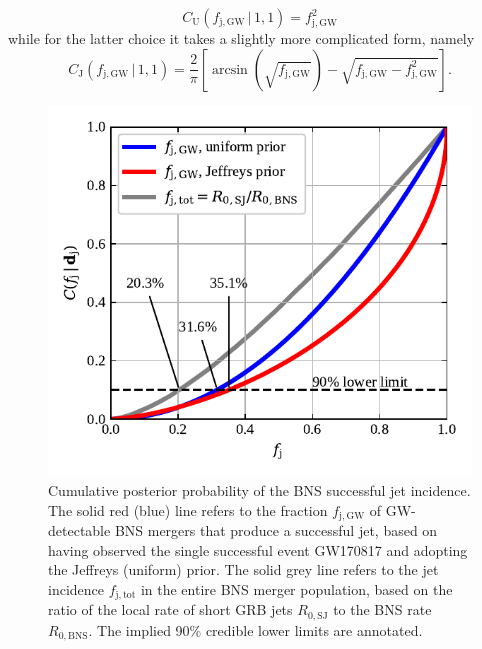 \documentclass[]{aa}
\newcommand{\resp}[1]{#1}
\begin{document}
\begin{equation}
 C_\mathrm{U}(f_\mathrm{j,GW}\,|\,1,1)=f_\mathrm{j,GW}^2
\end{equation}
while for the latter choice it takes a slightly more complicated form, namely 
\begin{equation}
C_\mathrm{J}(f_\mathrm{j,GW}\,|\,1,1)=\frac{2}{\pi}\left[\arcsin\left(\sqrt{f_\mathrm{j,GW}}\right)-\sqrt{f_\mathrm{j,GW}-f_\mathrm{j,GW}^2}\right].
\end{equation}
%
\begin{figure}
 \includegraphics[width=\columnwidth]{figures/cumulative_posterior.pdf}
 \caption{\small{Cumulative posterior probability of the BNS successful jet \resp{incidence}. The solid red (blue) line refers to the fraction $f_\mathrm{j,GW}$ of GW-detectable BNS mergers that produce a successful jet, based on having observed \resp{the} single successful event \resp{GW170817} and adopting the Jeffreys (uniform) prior. The solid grey line refers to the jet \resp{incidence} $f_\mathrm{j,tot}$ \resp{in the entire BNS merger population}, based on the ratio of the local rate \resp{of short GRB jets} $R_\mathrm{0,SJ}$ to the BNS rate $R_\mathrm{0,BNS}$. The implied 90\% credible lower limits are annotated.}}
 \label{fig:cumulative_posterior} 
\end{figure} 
%
\end{document}
